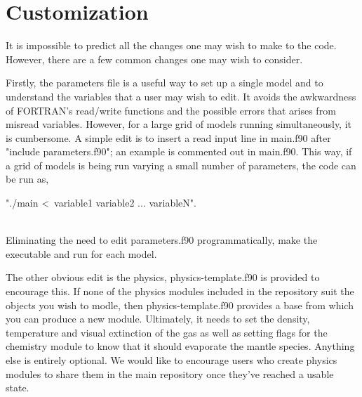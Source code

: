 \documentclass{llncs}
\begin{document}
\section{Customization}
\label{sec:alter}
It is impossible to predict all the changes one may wish to make to the code. However, there are a few common changes one may wish to consider.\par
Firstly, the parameters file is a useful way to set up a single model and to understand the variables that a user may wish to edit. It avoids the awkwardness of FORTRAN's read/write functions and the possible errors that arises from misread variables. However, for a large grid of models running simultaneously, it is cumbersome. A simple edit is to insert a read input line in main.f90 after "include parameters.f90"; an example is commented out in main.f90. This way, if a grid of models is being run varying a small number of parameters, the code can be run as,\\
 \centerline{"./main \textless ~variable1 variable2 ... variableN".}\\
Eliminating the need to edit parameters.f90 programmatically, make the executable and run for each model.\par
The other obvious edit is the physics, physics-template.f90 is provided to encourage this. If none of the physics modules included in the repository suit the objects you wish to modle, then physics-template.f90 provides a base from which you can produce a new module. Ultimately, it needs to set the density, temperature and visual extinction of the gas as well as setting flags for the chemistry module to know that it should evaporate the mantle species. Anything else is entirely optional. We would like to encourage users who create physics modules to share them in the main repository once they've reached a usable state.
 


\end{document}
